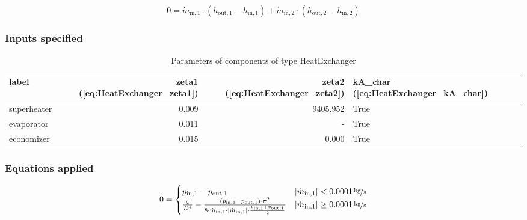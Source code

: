 \begin{equation}
\label{eq:HeatExchanger_energy_balance_constraints}
0 = \dot{m}_\mathrm{in,1} \cdot \left(h_\mathrm{out,1} - h_\mathrm{in,1} \right) +\dot{m}_\mathrm{in,2} \cdot \left(h_\mathrm{out,2} - h_\mathrm{in,2} \right)
\end{equation}


\subsubsection{Inputs specified}

\begin{table}[H]\begin{center}
\begin{tabular}{lrrl}
\toprule
       label &  zeta1 (\ref{eq:HeatExchanger_zeta1}) &  zeta2 (\ref{eq:HeatExchanger_zeta2}) &  kA\_char (\ref{eq:HeatExchanger_kA_char}) \\
\midrule
 superheater &                                 0.009 &                              9405.952 &                                       True \\
  evaporator &                                 0.011 &                                     - &                                       True \\
  economizer &                                 0.015 &                                 0.000 &                                       True \\
\bottomrule
\end{tabular}
\caption{Parameters of components of type HeatExchanger}
\end{center}\end{table}

\subsubsection{Equations applied}

\begin{equation}
\label{eq:HeatExchanger_zeta1}
0 = \begin{cases}
p_\mathrm{in,1}- p_\mathrm{out,1} & |\dot{m}_\mathrm{in,1}| < \unitfrac[0.0001]{kg}{s} \\
\frac{\zeta}{D^4}-\frac{(p_\mathrm{in,1}-p_\mathrm{out,1})\cdot\pi^2}{8\cdot\dot{m}_\mathrm{in,1}\cdot|\dot{m}_\mathrm{in,1}|\cdot\frac{v_\mathrm{in,1} + v_\mathrm{out,1}}{2}}& |\dot{m}_\mathrm{in,1}| \geq \unitfrac[0.0001]{kg}{s}
\end{cases}
\end{equation}

